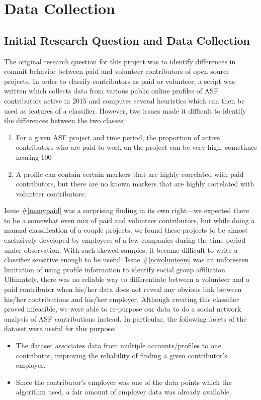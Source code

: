 \chapter{Data Collection}

\section{Initial Research Question and Data Collection}
The original research question for this project was to identify differences in commit behavior between paid and volunteer contributors of open source projects. In order to classify contributors as paid or volunteer, a script was written which collects data from various public online profiles of ASF contributors active in 2015 and computes several heuristics which can then be used as features of a classifier. However, two issues made it difficult to identify the differences between the two classes:
\begin{enumerate}
	\item \label{manypaid} For a given ASF project and time period, the proportion of active contributors who are paid to work on the project can be very high, sometimes nearing 100%
	\item \label{novolunteers} A profile can contain certain markers that are highly correlated with paid contributors, but there are no known markers that are highly correlated with volunteer contributors.
\end{enumerate}
Issue \#\ref{manypaid} was a surprising finding in its own right—we expected there to be a somewhat even mix of paid and volunteer contributors, but while doing a manual classification of a couple projects, we found these projects to be almost exclusively developed by employees of a few companies during the time period under observation. With such skewed samples, it became difficult to write a classifier sensitive enough to be useful.
Issue \#\ref{novolunteers} was an unforeseen limitation of using profile information to identify social group affiliation. Ultimately, there was no reliable way to differentiate between a volunteer and a paid contributor when his/her data does not reveal any obvious link between his/her contributions and his/her employer.
Although creating this classifier proved infeasible, we were able to re-purpose our data to do a social network analysis of ASF contributions instead. In particular, the following facets of the dataset were useful for this purpose:
\begin{itemize}
	\item The dataset associates data from multiple accounts/profiles to one contributor, improving the reliability of finding a given contributor’s employer.
	\item Since the contributor’s employer was one of the data points which the algorithm used, a fair amount of employer data was already available.
\end{itemize}

